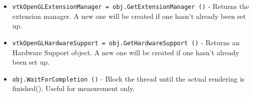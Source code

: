 \begin{itemize}
\item  \verb|vtkOpenGLExtensionManager = obj.GetExtensionManager ()| -  Returns the extension manager. A new one will be created if one hasn't
 already been set up.

\item  \verb|vtkOpenGLHardwareSupport = obj.GetHardwareSupport ()| -  Returns an Hardware Support object. A new one will be created if one
 hasn't already been set up.

\item  \verb|obj.WaitForCompletion ()| -  Block the thread until the actual rendering is finished().
 Useful for measurement only.

\end{itemize}

